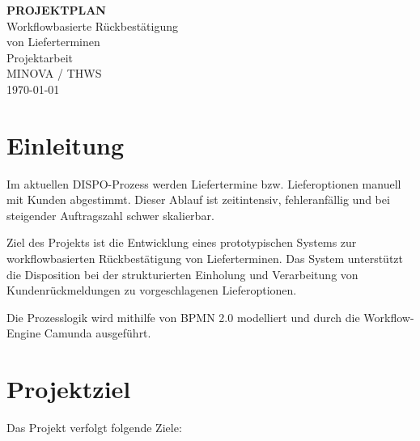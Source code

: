 \documentclass[12pt,a4paper]{article}
\begin{document}
\begin{titlepage}
    \centering

    \vspace*{3cm}

    {\Huge \textbf{PROJEKTPLAN}}\\[1.5cm]

    {\LARGE Workflowbasierte Rückbestätigung}\\[0.3cm]
    {\LARGE von Lieferterminen}\\[3cm]

    {\Large Projektarbeit}\\[2cm]

    {\large
    MINOVA / THWS
    }\\[1cm]

    {\large
    \today
    }

    \vfill

\end{titlepage}

\tableofcontents
\newpage

\section{Einleitung}

Im aktuellen DISPO-Prozess werden Liefertermine bzw. Lieferoptionen manuell mit Kunden abgestimmt. 
Dieser Ablauf ist zeitintensiv, fehleranfällig und bei steigender Auftragszahl schwer skalierbar.

Ziel des Projekts ist die Entwicklung eines prototypischen Systems zur workflowbasierten Rückbestätigung von Lieferterminen. 
Das System unterstützt die Disposition bei der strukturierten Einholung und Verarbeitung von Kundenrückmeldungen zu vorgeschlagenen Lieferoptionen.

Die Prozesslogik wird mithilfe von BPMN 2.0 modelliert und durch die Workflow-Engine Camunda ausgeführt.

\section{Projektziel}

Das Projekt verfolgt folgende Ziele:
\end{document}
